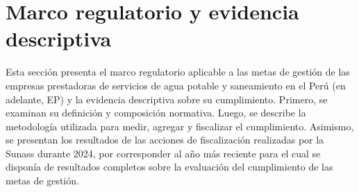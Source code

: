 \section{Marco regulatorio y evidencia descriptiva}

Esta sección presenta el marco regulatorio aplicable a las metas de gestión de las empresas prestadoras de servicios de agua potable y saneamiento en el Perú (en adelante, EP) y la evidencia descriptiva sobre su cumplimiento. Primero, se examinan su definición y composición normativa. Luego, se describe la metodología utilizada para medir, agregar y fiscalizar el cumplimiento. Asimismo, se presentan los resultados de las acciones de fiscalización realizadas por la Sunass durante 2024, por corresponder al año más reciente para el cual se disponía de resultados completos sobre la evaluación del cumplimiento de las metas de gestión.



